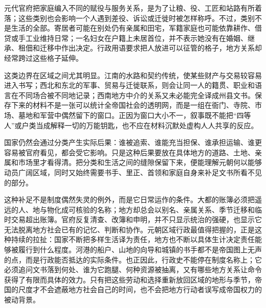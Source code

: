 元代官府把家庭编入不同的赋役与服务关系，是为了让粮、役、工匠和站路有所着落；这些类别也会影响一个人遇到差役、诉讼或迁徙时被怎样称呼。不过，类别不是生活的全部。寄居者可能在别处仍有亲属和田宅，军籍家庭也可能依靠耕作、借贷或手工业维持日常；一名妇女在户籍上未居首位，并不表示她没有在婚姻、继承、租佃和迁移中作出决定。行政用语要求把人放进可以征管的格子，地方关系却经常跨过这些格子延伸。

这类边界在区域之间尤其明显。江南的水路和契约传统，使某些财产与交易较容易进入书写；西北和东北的军事、贸易与迁徙联系，则会让同一人的籍贯、职业和语言在不同场合被不同地记录；西南地方中介的关系又未必能完全译成州县文书。保存下来的材料不是一张可以统计全帝国社会的透明网，而是一组在衙门、寺院、市场、墓地和军营中偶然留下的窗口。正因为窗口大小不一，叙事既不能把“四等人”或户类当成解释一切的万能钥匙，也不应在材料沉默处虚构人人共享的反应。

国家仍然会通过分类产生实际后果：谁被追索、谁能充当担保、谁承担运输、谁更容易被官府看见，都会受它影响。只是这种后果要放在具体地方的道路、土地、亲属和市场里才看得清。把分类和生活之间的缝隙保留下来，便能理解元朝何以能够动员广阔区域，同时又始终需要书手、里正、首领和家庭自身来补足文书所看不见的部分。

这种补足不是制度偶然失灵的例外，而是它日常运作的条件。大都的账簿必须把遥远的人、地与物化成可核验的名称；地方却总会以别名、亲属关系、季节迁移和临时交易超出账簿。官府反复清查、改簿和申明，并不只显示统治的强硬，也显示它无法脱离地方社会已有的记忆、判断和协作。元朝区域行政最值得把握的，正是这种持续的拉扯：国家不断把多样生活译为责任，地方也不断以具体生计决定责任能够被履行到什么程度。河港的船户、山地的向导和城镇的书手都不是帝国图上无声的点，而是行政能否抵达的实际条件。也正因此，行政史不能停在制度名称上；它必须追问文书落到何处、谁为它跑腿、何种资源被抽离，又有哪些地方关系让命令获得了有限而具体的效力。只有把这些劳动和选择重新放回区域的地形与季节，帝国的尺度才不会遮蔽地方社会自己的时间，也不会把地方行动者误写成帝国权力的被动背景。
